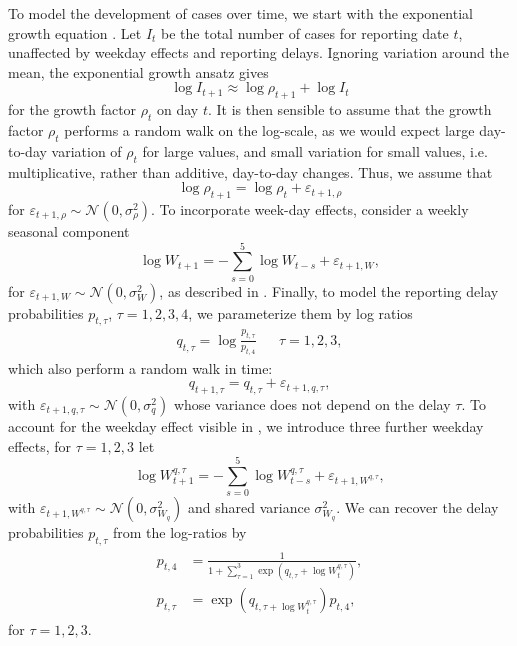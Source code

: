 To model the development of cases over time, we start with the exponential growth equation . Let $I_{t}$ be the total number of cases for reporting date $t$, unaffected by weekday effects and reporting delays. Ignoring variation around the mean, the exponential growth ansatz gives 
$$
    \log I_{t + 1} \approx \log \rho_{t + 1}  + \log I_{t}
$$
for the growth factor $\rho_{t}$ on day $t$. It is then sensible to assume that the growth factor $\rho_{t}$ performs a random walk on the log-scale, as we would expect large day-to-day variation of $\rho_{t}$ for large values, and small variation for small values, i.e. multiplicative, rather than additive, day-to-day changes. Thus, we assume that 
$$
    \log \rho_{t + 1} = \log \rho_{t} + \varepsilon_{t + 1, \rho}
$$
for $\varepsilon_{t + 1,\rho} \sim \mathcal N(0, \sigma^{2}_\rho)$. To incorporate week-day effects, consider a weekly seasonal component 
$$
    \log W_{t + 1} = - \sum_{s = 0}^{5} \log W_{t - s} + \varepsilon_{t + 1, W},
$$
for $\varepsilon_{t + 1, W} \sim \mathcal N(0, \sigma^{2}_{W})$, as described in . Finally, to model the reporting delay probabilities $p_{t,\tau}$, $\tau = 1,2,3,4$, we parameterize them by log ratios
\begin{align*}
    q_{t, \tau} = \log \frac{p_{t,\tau}}{p_{t,4}} && \tau = 1, 2, 3,
\end{align*}
which also perform a random walk in time: 
$$
    q_{t + 1, \tau} = q_{t, \tau} + \varepsilon_{t+1, q, \tau},
$$
with $\varepsilon_{t + 1, q, \tau} \sim \mathcal N(0, \sigma^{2}_{q})$ whose variance does not depend on the delay $\tau$. To account for the weekday effect visible in , we introduce three further weekday effects, for $\tau = 1,  2, 3$ let
$$
    \log W^{q,\tau}_{t + 1} = - \sum_{s = 0}^{5} \log W^{q,\tau}_{t - s} + \varepsilon_{t + 1, W^{q,\tau}},
$$
with $\varepsilon_{t+1, W^{q,\tau}} \sim \mathcal N \left( 0, \sigma^{2}_{W_q} \right)$ and shared variance $\sigma^{2}_{W_{q}}$.
We can recover the delay probabilities $p_{t, \tau}$ from the log-ratios by 
\begin{align}
    \begin{split}
        \label{eq:p-from-log-ratios}
    p_{t, 4} &= \frac{1}{1 + \sum_{\tau = 1}^3 \exp \left( q_{t,\tau} + \log W^{q,\tau}_{t} \right)}, \\
    p_{t, \tau} &= \exp\left( q_{t, \tau + \log W^{q, \tau}_{t}} \right) p_{t, 4},
    \end{split}
\end{align}
for $\tau = 1, 2, 3$.

